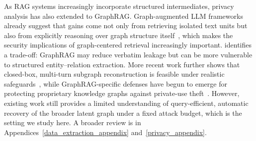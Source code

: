 \noindent As RAG systems increasingly incorporate structured intermediates, privacy analysis has also extended to GraphRAG. Graph-augmented LLM frameworks already suggest that gains come not only from retrieving isolated text units but also from explicitly reasoning over graph structure itself~\cite{jin2024graph}, which makes the security implications of graph-centered retrieval increasingly important. \citet{liu2025exposing} identifies a trade-off: GraphRAG may reduce verbatim leakage but can be more vulnerable to structured entity--relation extraction. More recent work further shows that closed-box, multi-turn subgraph reconstruction is feasible under realistic safeguards~\cite{song2026subgraph}, while GraphRAG-specific defenses have begun to emerge for protecting proprietary knowledge graphs against private-use theft~\cite{wang2026making}. However, existing work still provides a limited understanding of query-efficient, automatic recovery of the broader latent graph under a fixed attack budget, which is the setting we study here. A broader review is in Appendices~\ref{data_extraction_appendix} and~\ref{privacy_appendix}.



